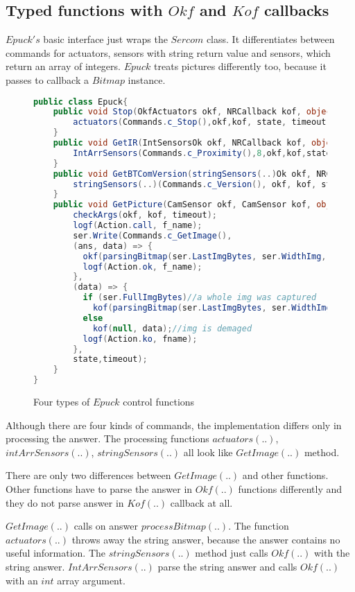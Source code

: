 \subsection{Typed functions with $Okf$ and $Kof$ callbacks} \label{sec:okfkofi}
	$Epuck's$ basic interface just wraps the $Sercom$ class. It differentiates between
	commands for actuators, sensors with string return value and sensors, which return an array of integers.
	$Epuck$ treats pictures differently too, because it passes to callback a $Bitmap$ instance.


\begin{figure}[!hbp]
\begin{lstlisting}[language=cs]
public class Epuck{
	public void Stop(OkfActuators okf, NRCallback kof, object state, double timeout) {
		actuators(Commands.c_Stop(),okf,kof, state, timeout, "Stop(..)");
	}
	public void GetIR(IntSensorsOk okf, NRCallback kof, object state, double timeout) {
		IntArrSensors(Commands.c_Proximity(),8,okf,kof,state,timeout,"GetIR(..)");
	}
	public void GetBTComVersion(stringSensors(..)Ok okf, NRCallback kof, object state, double timeout) {
		stringSensors(..)(Commands.c_Version(), okf, kof, state, timeout, "BTComVersion(..)");
	}
	public void GetPicture(CamSensor okf, CamSensor kof, object state, double timeout) {
		checkArgs(okf, kof, timeout);
		logf(Action.call, f_name);
		ser.Write(Commands.c_GetImage(),
		(ans, data) => {
		  okf(parsingBitmap(ser.LastImgBytes, ser.WidthImg, ser.HeightImg, ser.ModeImg), data);
		  logf(Action.ok, f_name);
		},
		(data) => {
		  if (ser.FullImgBytes)//a whole img was captured
		    kof(parsingBitmap(ser.LastImgBytes, ser.WidthImg, ser.HeightImg, ser.ModeImg), data);
		  else
		    kof(null, data);//img is demaged
		  logf(Action.ko, fname);
		},
		state,timeout);		
	}	   
}
\end{lstlisting}
\caption{Four types of $Epuck$ control functions}
\label{publicep}	
\end{figure}

	Although there are four kinds of commands, the implementation differs only in processing the answer.
	The processing functions $actuators(..)$, $intArrSensors(..)$, $stringSensors(..)$ all 
	look like $GetImage(..)$ method.
	
	There are only two differences between $GetImage(..)$ and other functions.
	Other functions have to parse the answer in $Okf(..)$ functions differently and they do not parse
	answer in $Kof(..)$ callback at all.

	$GetImage(..)$ calls on answer $processBitmap(..)$.
	The function $actuators(..)$ throws away the string answer, because the answer contains no useful information.
	The $stringSensors(..)$ method just calls $Okf(..)$ with the string answer.
	$IntArrSensors(..)$ parse the string answer and calls $Okf(..)$ with an $int$ array argument.


